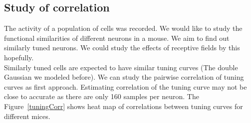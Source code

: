 \documentclass[11pt]{article}
\begin{document}
\subsection{Study of correlation} %
\label{sub:study_of_correlation}
The activity of a population of cells was recorded. We would like to study the functional similarities of different neurons in a mouse. We aim to find out similarly tuned neurons. We could study the effects of receptive fields by this hopefully.\\
Similarly tuned cells are expected to have similar tuning curves (The double Gaussian we modeled before). We can study the pairwise correlation of tuning curves as first approach. Estimating correlation of the tuning curve may not be close to accurate as there are only 160 samples per neuron. The Figure~\ref{tuningCorr} shows heat map of correlations between tuning curves for different mices.
\end{document}
